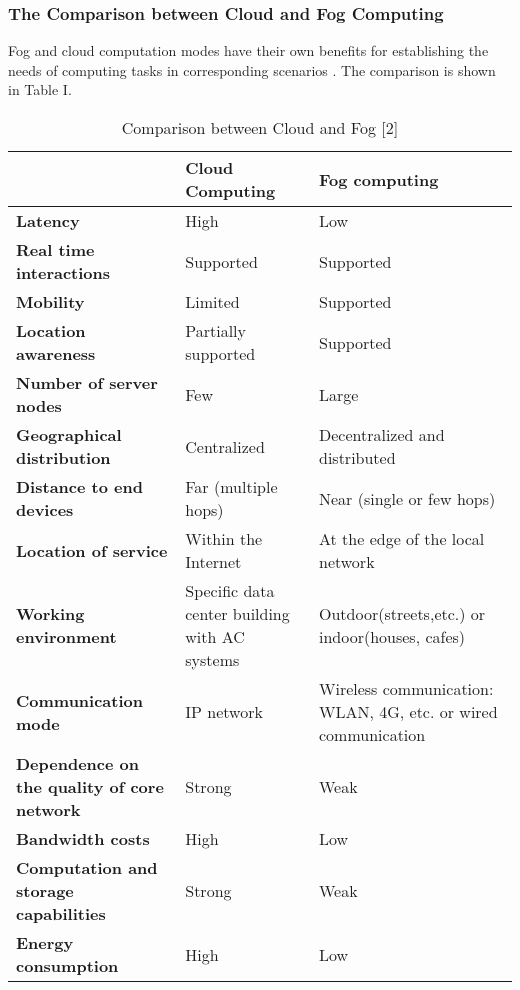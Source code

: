 \documentclass[10pt,a4paper,journal]{IEEEtran}
\begin{document}
\subsubsection{The Comparison between Cloud and Fog Computing}
	Fog and cloud computation modes have their own benefits for establishing the needs of computing
tasks in corresponding scenarios \cite{3}. The comparison is shown in Table I.
\begin{center}
\begin{table}[htbp]
	
	\caption[Comparison between Cloud and Fog]{Comparison between Cloud and Fog [2]}

\begin{tabular}{p{2.5cm}  p{2.5cm}  p{3cm} }
\hline
 & \textbf{Cloud Computing} & \textbf{Fog computing}\\
\hline 
\textbf{Latency} & High & Low\\

\textbf{Real time interactions} & Supported & Supported\\

\textbf{Mobility} & Limited & Supported\\

\textbf{Location awareness} & Partially supported & Supported\\

\textbf{Number of server nodes} & Few & Large\\

\textbf{Geographical distribution} & Centralized & Decentralized and distributed\\

\textbf{Distance to end devices} & Far (multiple hops)& Near (single or few hops)\\

\textbf{Location of service} & Within the Internet & At the edge of the local network\\

\textbf{Working environment} & Specific data center building with AC systems & Outdoor(streets,etc.) or indoor(houses, cafes)\\

\textbf{Communication mode} & IP network & Wireless communication: WLAN, 4G, etc. or wired communication\\

\textbf{Dependence on the quality of core network} &	Strong & Weak\\
\textbf{Bandwidth costs}	& High & Low\\

\textbf{Computation and storage capabilities} & Strong & Weak\\

\textbf{Energy consumption} & High & Low\\
\hline
\end{tabular}
\end{table}
\end{center}
\end{document}
